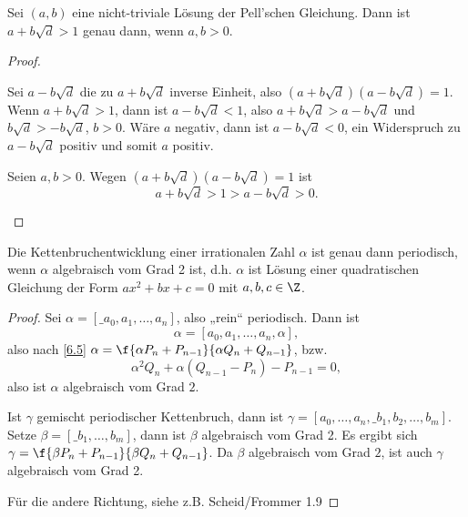 \setcounter{thm}{8}
\begin{lem} \label{6.9}
	Sei $(a,b)$ eine nicht-triviale Lösung der Pell'schen Gleichung.
	Dann ist $a + b \sqrt d > 1$ genau dann, wenn $a, b > 0$.
	\begin{proof}
		\begin{segnb}{\ProofImplication}
			Sei $a - b \sqrt d$ die zu $a + b \sqrt d$ inverse Einheit, also $(a + b \sqrt d)(a - b \sqrt d) = 1$.
			Wenn $a + b \sqrt d > 1$, dann ist $a - b \sqrt d < 1$, also $a + b \sqrt d > a - b \sqrt d$ und $b \sqrt d > - b \sqrt d$, $b > 0$.
			Wäre $a$ negativ, dann ist $a - b \sqrt d < 0$, ein Widerspruch zu $a - b \sqrt d$ positiv und somit $a$ positiv.
		\end{segnb}
		\begin{segnb}{\ProofImplication*}
			Seien $a, b > 0$.
			Wegen $(a + b\sqrt d)(a - b \sqrt d) = 1$ ist
			\[
				a + b \sqrt d > 1 > a - b \sqrt d > 0.
			\]
		\end{segnb}
	\end{proof}
\end{lem}

\begin{st} \label{6.10}
	Die Kettenbruchentwicklung einer irrationalen Zahl $\alpha$ ist genau dann periodisch, wenn $\alpha$ algebraisch vom Grad 2 ist, d.h. $\alpha$ ist Lösung einer quadratischen Gleichung der Form $ax^2 + bx + c = 0$ mit $a, b, c \in \Z$.
	\begin{proof}
		Sei $\alpha = [\_{a_0, a_1, \dotsc, a_n}]$, also „rein“ periodisch.
		Dann ist
		\[
			\alpha = [a_0, a_1, \dotsc, a_n, \alpha],
		\]
		also nach \ref{6.5} $\alpha = \f{\alpha P_n + P_{n-1}}{\alpha Q_n + Q_{n-1}}$, bzw.
		\[
			\alpha^2 Q_n + \alpha (Q_{n-1} - P_n) - P_{n-1} = 0,
		\]
		also ist $\alpha$ algebraisch vom Grad $2$.

		Ist $\gamma$ gemischt periodischer Kettenbruch, dann ist $\gamma = [a_0, \dotsc, a_n, \_{b_1, b_2, \dotsc, b_m}]$.
		Setze $\beta = [\_{b_1, \dotsc, b_m}]$, dann ist $\beta$ algebraisch vom Grad 2.
		Es ergibt sich $\gamma = \f{\beta P_n + P_{n-1}}{\beta Q_n + Q_{n-1}}$.
		Da $\beta$ algebraisch vom Grad $2$, ist auch $\gamma$ algebraisch vom Grad 2.

		Für die andere Richtung, siehe z.B. Scheid/Frommer 1.9 %
	\end{proof}
\end{st}
